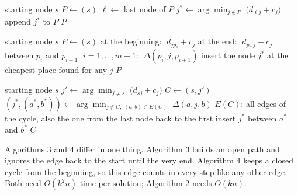 \documentclass[11pt,a4paper]{article}
\begin{document}
\begin{algorithm}[H]
\caption{Nearest neighbour, adding nodes only at the end of the path}
\begin{algorithmic}[1]
\Require starting node $s$
\State $P \gets (s)$
  \State $\ell \gets$ last node of $P$
  \State $j^\ast \gets \arg\min_{j \notin P} \; \bigl(d_{\ell j} + c_j\bigr)$
  \State append $j^\ast$ to $P$
\EndWhile
\State \Return $P$ 
\end{algorithmic}
\end{algorithm}

\begin{algorithm}[H]
\caption{Nearest neighbour, adding nodes at any position of the path}
\begin{algorithmic}[1]
\Require starting node $s$
\State $P \gets (s)$ 
    \State at the beginning: $\; d_{j p_1} + c_j$
    \State at the end: $\; d_{p_m j} + c_j$
    \State between $p_i$ and $p_{i+1}$, $i = 1, \dots, m-1$: $\; \Delta(p_i, j, p_{i+1})$
  \EndFor
  \State insert the node $j^\ast$ at the cheapest place found for any $j$
\EndWhile
\State \Return $P$ 
\end{algorithmic}
\end{algorithm}

\begin{algorithm}[H]
\caption{Greedy cycle}
\begin{algorithmic}[1]
\Require starting node $s$
\State $j' \gets \arg\min_{j \neq s} \; \bigl(d_{sj} + c_j\bigr)$ 
\State $C \gets (s, j')$ 
  \State $(j^\ast, (a^\ast, b^\ast)) \gets \arg\min_{j \notin C,\; (a,b) \in E(C)} \; \Delta(a, j, b)$
  \Statex \hspace{\algorithmicindent} $E(C)$: all edges of the cycle, also the one from the last node back to the first
  \State insert $j^\ast$ between $a^\ast$ and $b^\ast$
\EndWhile
\State \Return $C$
\end{algorithmic}
\end{algorithm}

Algorithms 3 and 4 differ in one thing. Algorithm 3 builds an open path and
ignores the edge back to the start until the very end. Algorithm 4 keeps a
closed cycle from the beginning, so this edge counts in every step like any
other edge. Both need $O(k^2 n)$ time per solution; Algorithm 2 needs $O(kn)$.
\end{document}
